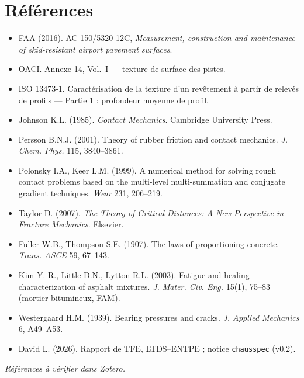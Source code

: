 \documentclass[11pt,a4paper]{article}
\newcommand{\cs}{\texttt{chausspec}}
\begin{document}
\section*{Références}
\small
\begin{itemize}[nosep,leftmargin=*]
\item FAA (2016). AC 150/5320-12C, \emph{Measurement, construction and maintenance of skid-resistant airport pavement surfaces}.
\item OACI. Annexe 14, Vol.~I --- texture de surface des pistes.
\item ISO 13473-1. Caractérisation de la texture d'un revêtement à partir de relevés de profils --- Partie 1 : profondeur moyenne de profil.
\item Johnson K.L. (1985). \emph{Contact Mechanics}. Cambridge University Press.
\item Persson B.N.J. (2001). Theory of rubber friction and contact mechanics. \emph{J. Chem. Phys.} 115, 3840--3861.
\item Polonsky I.A., Keer L.M. (1999). A numerical method for solving rough contact problems based on the multi-level multi-summation and conjugate gradient techniques. \emph{Wear} 231, 206--219.
\item Taylor D. (2007). \emph{The Theory of Critical Distances: A New Perspective in Fracture Mechanics}. Elsevier.
\item Fuller W.B., Thompson S.E. (1907). The laws of proportioning concrete. \emph{Trans. ASCE} 59, 67--143.
\item Kim Y.-R., Little D.N., Lytton R.L. (2003). Fatigue and healing characterization of asphalt mixtures. \emph{J. Mater. Civ. Eng.} 15(1), 75--83 (mortier bitumineux, FAM).
\item Westergaard H.M. (1939). Bearing pressures and cracks. \emph{J. Applied Mechanics} 6, A49--A53.
\item David L. (2026). Rapport de TFE, LTDS--ENTPE ; notice \cs{} (v0.2).
\end{itemize}
\normalsize\noindent\emph{Références à vérifier dans Zotero.}
\end{document}
